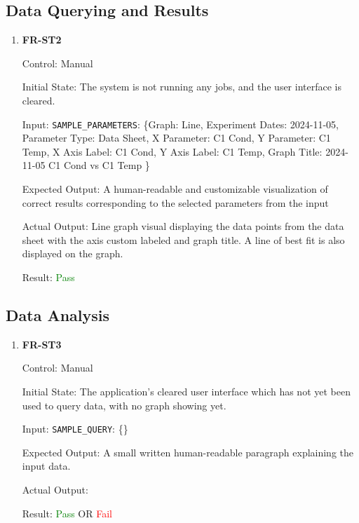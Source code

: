 \documentclass[12pt, titlepage]{article}
\begin{document}
\subsection{Data Querying and Results}
\begin{enumerate}
\item{\textbf{FR-ST2}} \label{FR:ST2}

Control: Manual

Initial State: The system is not running any jobs, and the user interface is
cleared.

Input: \texttt{SAMPLE\_PARAMETERS}: \{Graph: Line, Experiment Dates: 2024-11-05,
Parameter Type: Data Sheet, X Parameter: C1 Cond, Y Parameter: C1 Temp, X Axis
Label: C1 Cond, Y Axis Label: C1 Temp, Graph Title: 2024-11-05 C1 Cond vs C1
Temp \}

Expected Output: A human-readable and customizable visualization of correct
results corresponding to the selected parameters from the input

Actual Output: Line graph visual displaying the data points from the data sheet
with the axis custom labeled and graph title. A line of best fit is also
displayed on the graph.

Result: \textcolor{green}{Pass}
\end{enumerate}

\subsection{Data Analysis}
\begin{enumerate}
\item{\textbf{FR-ST3}} \label{FR:ST3}

Control: Manual

Initial State: The application's cleared user interface which has not yet been
used to query data, with no graph showing yet.

Input: \texttt{SAMPLE\_QUERY}: \{\}

Expected Output: A small written human-readable paragraph explaining the input
data.

Actual Output:

Result: \textcolor{green}{Pass} OR \textcolor{red}{Fail}
\end{enumerate}
\end{document}
